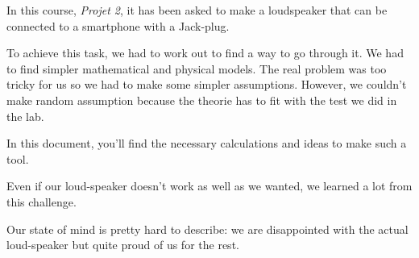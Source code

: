 

\begin{abstract-en}


In this course, \textit{Projet 2}, it has been asked to make a loudspeaker that can be connected to a smartphone with a Jack-plug.

To achieve this task, we had to work out to find a way to go through it.  We had to find simpler mathematical and physical models.  
The real problem was too tricky for us so we had to make some simpler assumptions.  However, we couldn't make random assumption because the theorie has to fit with the test we did in the lab.

In this document, you'll find the necessary calculations and ideas to make such a tool.

Even if our loud-speaker doesn't work as well as we wanted, we learned a lot from this challenge. 

Our state of mind is pretty hard to describe: we are disappointed with the actual loud-speaker but quite proud of us for the rest.


\end{abstract-en}


